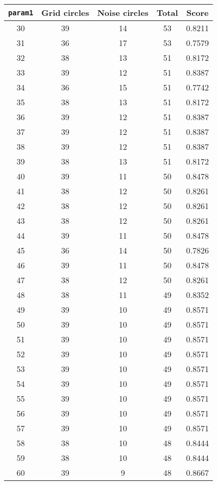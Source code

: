 \documentclass[letterpaper, 12pt]{article}
\begin{document}
\begin{longtable}{|c|c|c|c|c|}
\hline
\textbf{\texttt{param1}} & \textbf{Grid circles} & \textbf{Noise circles} & \textbf{Total} & \textbf{Score} \\
\hline
30 & 39 & 14 & 53 & 0.8211 \\
\hline
31 & 36 & 17 & 53 & 0.7579 \\
\hline
32 & 38 & 13 & 51 & 0.8172 \\
\hline
33 & 39 & 12 & 51 & 0.8387 \\
\hline
34 & 36 & 15 & 51 & 0.7742 \\
\hline
35 & 38 & 13 & 51 & 0.8172 \\
\hline
36 & 39 & 12 & 51 & 0.8387 \\
\hline
37 & 39 & 12 & 51 & 0.8387 \\
\hline
38 & 39 & 12 & 51 & 0.8387 \\
\hline
39 & 38 & 13 & 51 & 0.8172 \\
\hline
40 & 39 & 11 & 50 & 0.8478 \\
\hline
41 & 38 & 12 & 50 & 0.8261 \\
\hline
42 & 38 & 12 & 50 & 0.8261 \\
\hline
43 & 38 & 12 & 50 & 0.8261 \\
\hline
44 & 39 & 11 & 50 & 0.8478 \\
\hline
45 & 36 & 14 & 50 & 0.7826 \\
\hline
46 & 39 & 11 & 50 & 0.8478 \\
\hline
47 & 38 & 12 & 50 & 0.8261 \\
\hline
48 & 38 & 11 & 49 & 0.8352 \\
\hline
49 & 39 & 10 & 49 & 0.8571 \\
\hline
50 & 39 & 10 & 49 & 0.8571 \\
\hline
51 & 39 & 10 & 49 & 0.8571 \\
\hline
52 & 39 & 10 & 49 & 0.8571 \\
\hline
53 & 39 & 10 & 49 & 0.8571 \\
\hline
54 & 39 & 10 & 49 & 0.8571 \\
\hline
55 & 39 & 10 & 49 & 0.8571 \\
\hline
56 & 39 & 10 & 49 & 0.8571 \\
\hline
57 & 39 & 10 & 49 & 0.8571 \\
\hline
58 & 38 & 10 & 48 & 0.8444 \\
\hline
59 & 38 & 10 & 48 & 0.8444 \\
\hline
60 & 39 & 9 & 48 & 0.8667 \\

\end{longtable}
\end{document}

